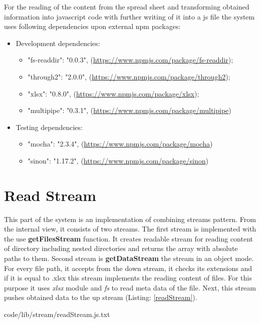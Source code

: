 For the reading of the content from the spread sheet and transforming obtained information into javascript code with further writing of it into a js file the system uses following dependencies upon external npm packages:
\begin{itemize}
	\item Development dependencies:
	\begin{itemize}
		\item  "fs-readdir": "0.0.3", (\url{https://www.npmjs.com/package/fs-readdir});
		\item "through2": "2.0.0", (\url{https://www.npmjs.com/package/through2});
		\item "xlsx": "0.8.0", (\url{https://www.npmjs.com/package/xlsx});
		\item "multipipe": "0.3.1", (\url{https://www.npmjs.com/package/multipipe})
	\end{itemize}
	\item Testing dependencies:
	\begin{itemize}
		\item "mocha": "2.3.4", (\url{https://www.npmjs.com/package/mocha})
		\item "sinon": "1.17.2", (\url{https://www.npmjs.com/package/sinon})
	\end{itemize}
\end{itemize}

\section{Read Stream}
\label{sec:read}
This part of the system is an implementation of combining streams pattern. From the internal view, it consists of two streams.  The first stream is implemented with the use  \textbf{getFilesStream} function. It creates readable stream for reading content of directory including nested directories and returns the array with absolute paths to them.
Second stream is \textbf{getDataStream} the stream in an object mode. For every file path, it accepts from the down stream, it checks its extensions and if it is equal to .xlsx this stream implements the reading content of files. For this purpose it uses \textit{xlsx} module and  \textit{fs}  to read meta data of the file. Next, this stream pushes obtained data to the up stream (Listing: \ref{readStream}).
 

{code/lib/stream/readStream.js.txt}

